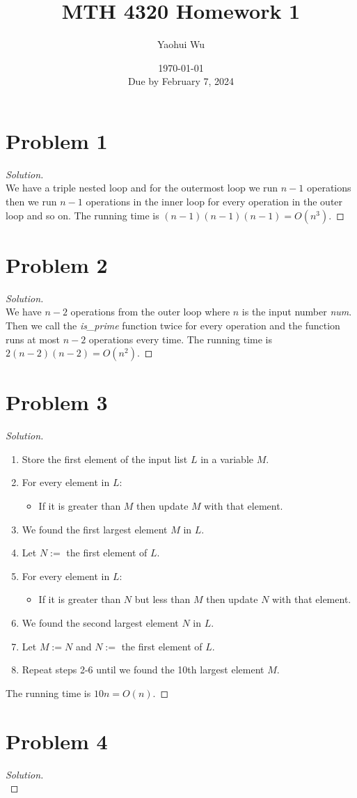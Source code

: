 \documentclass[12pt, letterpaper]{article}
\title{MTH 4320 Homework 1}
\author{Yaohui Wu}
\date{\today \\ Due by February 7, 2024}
\newenvironment{solution}{\begin{proof}[Solution]\hfill\\}{\end{proof}}
\begin{document}
\maketitle
\tableofcontents
\section{Problem 1}
\begin{solution}
    We have a triple nested loop and for the outermost loop we run \(n-1\) operations
    then we run \(n-1\) operations in the inner loop for every operation in the outer loop
    and so on. The running time is \((n-1)(n-1)(n-1)=O(n^3)\).
\end{solution}

\section{Problem 2}
\begin{solution}
    We have \(n-2\) operations from the outer loop where \(n\) is the input number \textit{num}. Then we call the \textit{is\_prime} function twice for every operation
    and the function runs at most \(n-2\) operations every time. The running time is \(2(n-2)(n-2)=O(n^2)\).
\end{solution}

\section{Problem 3}
\begin{solution}
    \begin{enumerate}
        \item Store the first element of the input list \(L\) in a variable \(M\).
        \item For every element in \(L\):
        \begin{itemize}
            \item If it is greater than \(M\) then update \(M\) with that element.
        \end{itemize}
        \item We found the first largest element \(M\) in \(L\).
        \item Let \(N:=\) the first element of \(L\).
        \item For every element in \(L\):
        \begin{itemize}
            \item If it is greater than \(N\) but less than \(M\) then update \(N\) with that element.
        \end{itemize}
        \item We found the second largest element \(N\) in \(L\).
        \item Let \(M:=N\) and \(N:=\) the first element of \(L\).
        \item Repeat steps 2-6 until we found the 10th largest element \(M\).
    \end{enumerate}
    The running time is \(10n=O(n)\).
\end{solution}

\section{Problem 4}
\begin{solution}
    
\end{solution}
\end{document}
